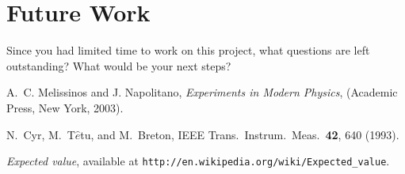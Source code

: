 \documentclass[letterpaper,12pt]{article}
\begin{document}
\section{Future Work}
Since you had limited time to work on this project, what questions are left outstanding? What would be your next steps? 

\begin{center}

 \end{center}
 

\begin{thebibliography}{99}

A.~C. Melissinos and J. Napolitano, \textit{Experiments in Modern Physics},
(Academic Press, New York, 2003).

N.\ Cyr, M.\ T$\hat{e}$tu, and M.\ Breton,
IEEE Trans.\ Instrum.\ Meas.\ \textbf{42}, 640 (1993).

 \emph{Expected value},  available at
\texttt{http://en.wikipedia.org/wiki/Expected\_value}.

\end{thebibliography}
\end{document}
